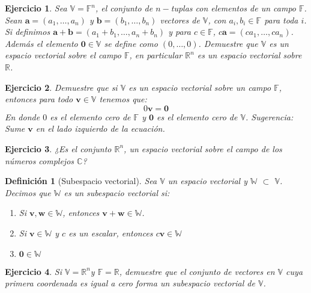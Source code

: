 \documentclass[11pt]{report}
\theoremstyle{break}
\newtheorem{definicion}{Definición}[chapter]
\newtheorem{ejercicio}{Ejercicio}[chapter]
\theoremstyle{break}
\newcommand{\mbb}[1]{$\mathbb{#1}$}
\begin{document}
\begin{ejercicio}
\label{ejemplo:espacio-vectorial-tuplas}
Sea $\mathbb{V} = \mathbb{F}^n$, el conjunto de $n-$tuplas con elementos de un campo \mbb{F}. Sean $\bm{a} = (a_1,\ldots,a_n)$ y $\bm{b} = (b_1,\ldots,b_n)$ vectores de \mbb{V}, con $a_i, b_i \in \mathbb{F}$ para toda $i$.
Si definimos $\bm{a} + \bm{b} = (a_1 + b_1, \ldots, a_n + b_n)$ y para $c \in \mathbb{F}$, $c\bm{a} = (ca_1,\ldots,ca_n)$.
Además el elemento $\bm{0} \in \mathbb{V}$ se define como $(0,\ldots,0)$.\newline
Demuestre que \mbb{V} es un espacio vectorial sobre el campo \mbb{F}, en particular $\mathbb{R}^n$ es un espacio vectorial sobre \mbb{R}.
\end{ejercicio}

\begin{ejercicio}
Demuestre que si \mbb{V} es un espacio vectorial sobre un campo \mbb{F}, entonces para todo $\bm{v} \in \mathbb{V}$ tenemos que:
$$ 0\bm{v} = \bm{0}$$
En donde $0$ es el elemento cero de \mbb{F} y $\bm{0}$ es el elemento cero de \mbb{V}.\newline
Sugerencia: Sume $\bm{v}$ en el lado izquierdo de la ecuación.
\end{ejercicio}

\begin{ejercicio}
¿Es el conjunto $\mathbb{R}^n$, un espacio vectorial sobre el campo de los números complejos \mbb{C}?
\end{ejercicio}

\begin{definicion}[Subespacio vectorial]
\label{definicion:subespacio-vectorial}
Sea \mbb{V} un espacio vectorial y \mbb{W} $\subset$ \mbb{V}. Decimos que \mbb{W} es un subespacio vectorial si:

\begin{enumerate}[label=\alph*)]
\item Si $\bm{v}, \bm{w} \in \mathbb{W}$, entonces $\bm{v} + \bm{w} \in \mathbb{W}$.

\item Si $\bm{v} \in \mathbb{W}$ y $c$ es un escalar, entonces $c\bm{v} \in \mathbb{W}$

\item $\bm{0} \in \mathbb{W}$
\end{enumerate}
\end{definicion}

\begin{ejercicio}
Si $\mathbb{V} = \mathbb{R}^n$y $\mathbb{F} = \mathbb{R}$, demuestre que el conjunto de vectores en \mbb{V} cuya primera coordenada es igual a cero forma un subespacio vectorial de \mbb{V}.
\end{ejercicio}
\end{document}
